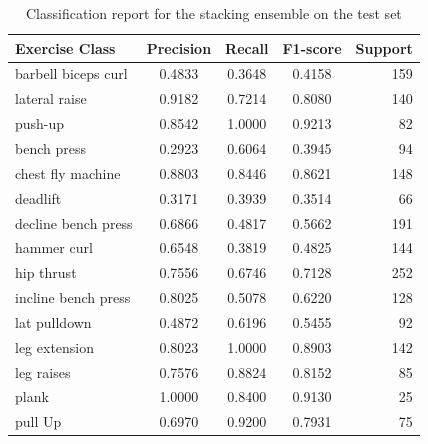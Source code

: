 \documentclass[journal,onecolumn, 11pt]{IEEEtran}
\begin{document}
\begin{table}[H]
\centering
\caption{Classification report for the stacking ensemble on the test set}
\label{tab:stacking-report}
\begin{tabular}{l c c c r}
\hline
\textbf{Exercise Class}   & \textbf{Precision} & \textbf{Recall} & \textbf{F1-score} & \textbf{Support} \\
\hline
barbell biceps curl       & 0.4833             & 0.3648          & 0.4158            & 159              \\
lateral raise             & 0.9182             & 0.7214          & 0.8080            & 140              \\
push-up                   & 0.8542             & 1.0000          & 0.9213            & 82               \\
bench press               & 0.2923             & 0.6064          & 0.3945            & 94               \\
chest fly machine         & 0.8803             & 0.8446          & 0.8621            & 148              \\
deadlift                  & 0.3171             & 0.3939          & 0.3514            & 66               \\
decline bench press       & 0.6866             & 0.4817          & 0.5662            & 191              \\
hammer curl               & 0.6548             & 0.3819          & 0.4825            & 144              \\
hip thrust                & 0.7556             & 0.6746          & 0.7128            & 252              \\
incline bench press       & 0.8025             & 0.5078          & 0.6220            & 128              \\
lat pulldown              & 0.4872             & 0.6196          & 0.5455            & 92               \\
leg extension             & 0.8023             & 1.0000          & 0.8903            & 142              \\
leg raises                & 0.7576             & 0.8824          & 0.8152            & 85               \\
plank                     & 1.0000             & 0.8400          & 0.9130            & 25               \\
pull Up                   & 0.6970             & 0.9200          & 0.7931            & 75               \\

\end{tabular}
\end{table}
\end{document}
